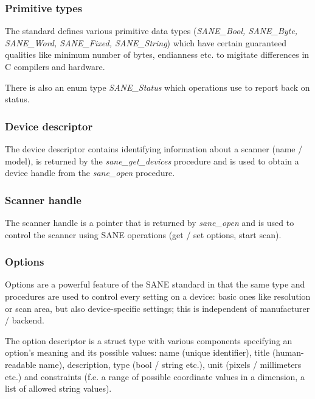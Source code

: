 \documentclass{article}
\begin{document}
\cite[3.1]{sane_standard}

\subsubsection{Primitive types}

The standard defines various primitive data types
({\it SANE\_Bool, SANE\_Byte, SANE\_Word, SANE\_Fixed, SANE\_String})
which have certain guaranteed qualities
like minimum number of bytes, endianness etc. to migitate differences in
C compilers and hardware.

There is also an enum type {\it SANE\_Status} which operations use to report back on
status.

\subsubsection{Device descriptor}

The device descriptor contains identifying information about a scanner (name / model),
is returned by the {\it sane\_get\_devices} procedure and is used to obtain a device handle
from the {\it sane\_open} procedure.

\subsubsection{Scanner handle}

The scanner handle is a pointer that is returned by {\it sane\_open} and is used to
control the scanner using SANE operations (get / set options, start scan).

\subsubsection{Options}

Options are a powerful feature of the SANE standard in that the same type and procedures
are used to control every setting on a device: basic ones like resolution or scan area, but also
device-specific settings; this is independent of manufacturer / backend.

The option descriptor is a struct type with various components specifying an option's
meaning and its possible values: name (unique identifier),
title (human-readable name), description, type (bool / string etc.), unit (pixels / millimeters etc.)
and constraints (f.e. a range of possible coordinate values in a dimension,
a list of allowed string values).

\cite[4.2.9]{sane_standard}
\end{document}
